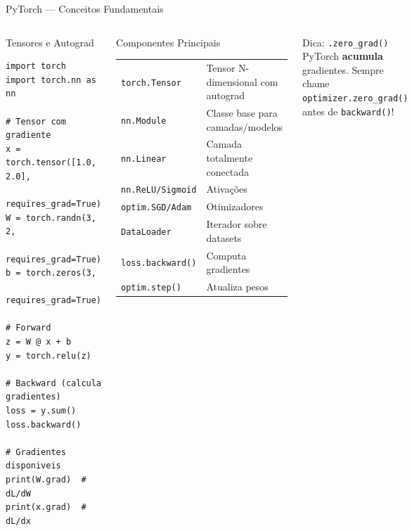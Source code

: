 \documentclass[7pt, aspectratio=169,10pt]{beamer}
\begin{document}
\begin{frame}[fragile]{PyTorch — Conceitos Fundamentais}
\begin{columns}[T]
\begin{block}{Tensores e Autograd}
\begin{lstlisting}
import torch
import torch.nn as nn

# Tensor com gradiente
x = torch.tensor([1.0, 2.0], 
                  requires_grad=True)
W = torch.randn(3, 2, 
                requires_grad=True)
b = torch.zeros(3, 
                requires_grad=True)

# Forward
z = W @ x + b
y = torch.relu(z)

# Backward (calcula gradientes)
loss = y.sum()
loss.backward()

# Gradientes disponiveis
print(W.grad)  # dL/dW
print(x.grad)  # dL/dx
\end{lstlisting}
\end{block}
\begin{block}{Componentes Principais}
\small
\begin{tabular}{lp{3.5cm}}
\texttt{torch.Tensor} & Tensor N-dimensional com autograd \\
\texttt{nn.Module} & Classe base para camadas/modelos \\
\texttt{nn.Linear} & Camada totalmente conectada \\
\texttt{nn.ReLU/Sigmoid} & Ativações \\
\texttt{optim.SGD/Adam} & Otimizadores \\
\texttt{DataLoader} & Iterador sobre datasets \\
\texttt{loss.backward()} & Computa gradientes \\
\texttt{optim.step()} & Atualiza pesos \\
\end{tabular}
\end{block}
\begin{alertblock}{Dica: \texttt{.zero\_grad()}}
\small
PyTorch \textbf{acumula} gradientes. Sempre chame \texttt{optimizer.zero\_grad()} antes de \texttt{backward()}!
\end{alertblock}
\end{columns}
\end{frame}
\end{document}
